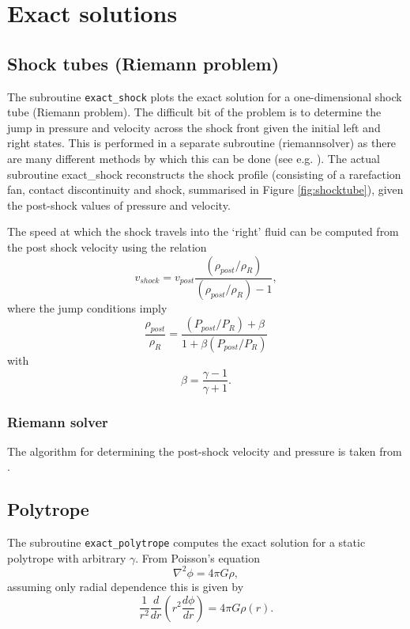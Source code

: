 \documentclass[a4paper,12pt]{article}
\begin{document}
\section{Exact solutions}
\label{sec:exact}
\subsection{Shock tubes (Riemann problem)}
 The subroutine \verb+exact_shock+ plots the exact solution for a one-dimensional shock tube
(Riemann problem). The difficult bit of the problem is to determine the jump in
pressure and velocity across the shock front given the initial left and right
states. This is performed in a separate subroutine (riemannsolver) as there are 
many different methods by which this can be done (see e.g. \citealt{toro92}). 
The actual subroutine exact\_shock reconstructs the shock profile (consisting of
a rarefaction fan, contact discontinuity and shock, summarised in Figure
\ref{fig:shocktube}), given the post-shock values of pressure and
velocity. 

 The speed at which the shock travels into the `right' fluid can be computed from the post shock
velocity using the relation
\begin{equation}
v_{shock} = v_{post}\frac{(\rho_{post}/\rho_R)}{(\rho_{post}/\rho_R)- 1},
\end{equation}
where the jump conditions imply
\begin{equation}
\frac{\rho_{post}}{\rho_R} = \frac{(P_{post}/P_R) + \beta}{1 + \beta (P_{post}/P_R)}
\end{equation}
with
\begin{equation}
\beta = \frac{\gamma - 1}{\gamma + 1}.
\end{equation}

\subsubsection{Riemann solver}
 The algorithm for determining the post-shock velocity and pressure is taken
from \citet{toro92}.

\subsection{Polytrope}
 The subroutine \verb+exact_polytrope+ computes the exact solution for a static polytrope with
arbitrary $\gamma$. From Poisson's equation
\begin{equation}
\nabla^2 \phi = 4\pi G \rho,
\end{equation}
assuming only radial dependence this is given by
\begin{equation}
\frac{1}{r^{2}} \frac{d}{dr} \left(r^{2} \frac{d\phi}{dr} \right) = 4\pi G \rho(r).
\label{eq:poissonsph}
\end{equation}
  
\end{document}
